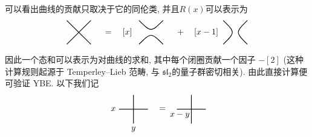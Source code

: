 \documentclass[twoside]{article}
\begin{document}
可以看出曲线的贡献只取决于它的同伦类, 并且$R(x)$可以表示为
\[
    \begin{tikzpicture}[
        scale = .5,
        thick
    ]
        \begin{scope}[shift={(0,0)}]
            \draw (-1, -1) -- (1, 1) (-1, 1) -- (1, -1);
        \end{scope}
        \node at (3.3, 0) {$= \quad [x]$};
        \begin{scope}[shift={(6,0)}]
            \draw (-1, 1) .. controls (0, 0) and (0, 0) .. (1, 1);
            \draw (-1, -1) .. controls (0, 0) and (0, 0) .. (1, -1);
        \end{scope}
        \node at (9.8, 0) {${} + \quad [x - 1]$};
        \begin{scope}[shift={(13,0)}]
            \draw (-1, 1) .. controls (0, 0) and (0, 0) .. (-1, -1);
            \draw (1, 1) .. controls (0, 0) and (0, 0) .. (1, -1);
        \end{scope}
    \end{tikzpicture}  
\]

因此一个态和可以表示为对曲线的求和, 
其中每个闭圈贡献一个因子 $-[2]$ 
(这种计算规则起源于 Temperley--Lieb 范畴, 
与 $\mathfrak{sl}_2$的量子群密切相关). 
由此直接计算便可验证 YBE. 
以下我们记
\[
    \begin{tikzpicture}[
        scale = .6,
        thick
    ]
        \begin{scope}[shift={(0,0)}]
            \draw (-1, 0)--( 0, 0);
            \draw ( 1, 0)--( 0, 0);
            \draw ( 0, 0)--( 0, 1);
            \draw ( 0, 0)--( 0,-1);
            \node at (-1.4, 0) {$x$};
            \node at (0, -1.4) {$y$};
        \end{scope}
        \node at (2, 0) {$=$};
        \begin{scope}[shift={(4,0)}]
            \draw (-1, 0)--( 0, 0);
            \draw ( 1, 0)--( 0, 0);
            \draw ( 0, 0)--( 0, 1);
            \draw ( 0, 0)--( 0,-1);
            \node at (-.8, -.4) {$x - y$};
        \end{scope}
    \end{tikzpicture}    
\]
\end{document}
